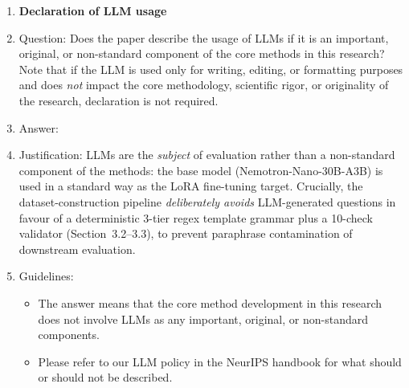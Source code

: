 \begin{enumerate}
\item {\bf Declaration of LLM usage}
    \item[] Question: Does the paper describe the usage of LLMs if it is an important, original, or non-standard component of the core methods in this research? Note that if the LLM is used only for writing, editing, or formatting purposes and does \emph{not} impact the core methodology, scientific rigor, or originality of the research, declaration is not required.
    \item[] Answer: \answerNA{}
    \item[] Justification: LLMs are the \emph{subject} of evaluation rather than a non-standard component of the methods: the base model (Nemotron-Nano-30B-A3B) is used in a standard way as the LoRA fine-tuning target. Crucially, the dataset-construction pipeline \emph{deliberately avoids} LLM-generated questions in favour of a deterministic 3-tier regex template grammar plus a 10-check validator (Section~3.2--3.3), to prevent paraphrase contamination of downstream evaluation.
    \item[] Guidelines:
    \begin{itemize}
        \item The answer \answerNA{} means that the core method development in this research does not involve LLMs as any important, original, or non-standard components.
        \item Please refer to our LLM policy in the NeurIPS handbook for what should or should not be described.
    \end{itemize}

\end{enumerate}
